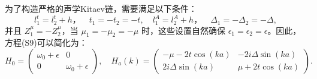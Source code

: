 为了构造严格的声学Kitaev链，需要满足以下条件：
\[
l_1^t = l_2^t + h， \quad t_1 = -t_2 = -t, \quad
l_1^A = l_2^A + h，\quad \Delta_1 = -\Delta_2 = -\Delta,
\]
并且 \( Z_1^\mu = -Z_2^\mu \)，当 \( \mu_1 = -\mu_2 = -\mu \) 时，这些设置自然确保 \( \epsilon_1 = \epsilon_2 = \epsilon \)。因此，方程(S9)可以简化为：
\[
H_0 =
\begin{pmatrix}
\omega_0 + \epsilon & 0 \\
0 & \omega_0 + \epsilon
\end{pmatrix},
\quad
H_a(k) =
\begin{pmatrix}
-\mu - 2t\cos(ka) & -2i\Delta\sin(ka) \\
2i\Delta\sin(ka) & \mu + 2t\cos(ka)
\end{pmatrix}. 
\]

